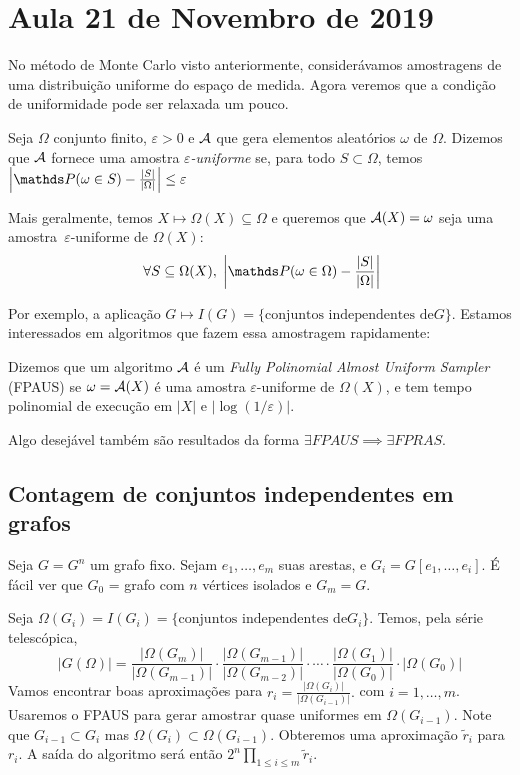 \section{Aula 21 de Novembro de 2019}
\label{2019_11_21}

No método de Monte Carlo visto anteriormente, considerávamos 
amostragens de uma distribuição uniforme do espaço de medida. Agora
veremos que a condição de uniformidade pode ser relaxada um pouco.

\begin{definicao}
	Seja $\Omega$ conjunto finito, $\varepsilon > 0$ e $\mathcal A$ que gera 
	elementos aleatórios $\omega$ de $\Omega$. Dizemos que $\mathcal A$ fornece
	uma amostra \emph{$\varepsilon$-uniforme} se, para todo 
	$S\subset \Omega$, temos 
	$\left|\PP(\omega \in S) - \frac{|S|}{|\Omega|}\right|\leq \varepsilon$
\end{definicao}

Mais geralmente, temos $X \mapsto \Omega(X) \subseteq \Omega$ e 
queremos que $\mathcal A(X) = \omega$ seja uma amostra~$\varepsilon$-uniforme
de $\Omega(X)$:
\begin{equation*}\
\forall S\subset \Omega(X), \;
\left| \PP(\omega \in \Omega) - \frac{|S|}{|\Omega|} \right|
\end{equation*}

Por exemplo, a aplicação $G\mapsto I(G) = \{\text{conjuntos independentes de} G\}$.
Estamos interessados em algoritmos que fazem essa amostragem rapidamente:
\begin{definicao}[FPAUS]
	Dizemos que um algoritmo $\mathcal A$ é um \emph{Fully Polinomial Almost 
	Uniform Sampler} (FPAUS) se $\omega = \mathcal A(X)$ é uma amostra
	$\varepsilon$-uniforme de $\Omega(X)$, e tem tempo polinomial
	de execução em $|X|$ e $|\log (1/\varepsilon)|$.
\end{definicao}
Algo desejável também são resultados da forma $\exists FPAUS \implies \exists FPRAS$.

\subsection{Contagem de conjuntos independentes em grafos}
Seja $G = G^n$ um grafo fixo. Sejam $e_1, \dots, e_m$ suas arestas, e 
$G_i = G[e_1, \dots, e_i]$. É fácil ver que $G_0$ = grafo com $n$ 
vértices isolados e $G_m = G$.

Seja $\Omega(G_i) = I(G_i) = \{ \text{conjuntos independentes de} G_i \}$.
Temos, pela série telescópica,
\begin{equation*}\label{key}
|G(\Omega)| = \frac{|\Omega(G_{m})|}{|\Omega(G_{m-1})|} \cdot \frac{|\Omega(G_{m-1})|}{|\Omega(G_{m-2})|} \cdot \cdots \cdot \frac{|\Omega(G_{1})|}{|\Omega(G_{0})|}\cdot|\Omega(G_0)|
\end{equation*}
Vamos encontrar boas aproximações para $r_i = \frac{|\Omega(G_i)|}{|\Omega(G_{i-1})|}.$ com $i = 1, \dots, m$.
Usaremos o FPAUS para gerar amostrar quase uniformes em $\Omega(G_{i-1})$. Note que $G_{i-1} \subset G_i$ mas 
$\Omega(G_{i}) \subset \Omega(G_{i-1})$. Obteremos uma aproximação
$\tilde{r}_i$ para $r_i$. A saída do algoritmo será então
$2^n\prod_{1 \leq i \leq m}\tilde{r}_i$.

